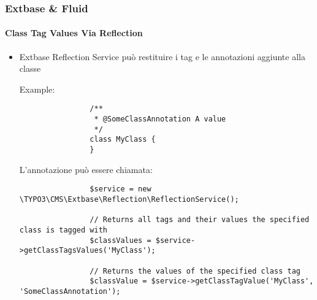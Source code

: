 \begin{frame}[fragile]
	\frametitle{Extbase \& Fluid}
	\framesubtitle{Class Tag Values Via Reflection}

	\lstset{
		basicstyle=\tiny\ttfamily
	}

	\begin{itemize}
		\item Extbase Reflection Service può restituire i tag e le annotazioni aggiunte alla classe\newline

			Example:
			\begin{lstlisting}
				/**
				 * @SomeClassAnnotation A value
				 */
				class MyClass {
				}
			\end{lstlisting}

			L'annotazione può essere chiamata:
			\begin{lstlisting}
				$service = new \TYPO3\CMS\Extbase\Reflection\ReflectionService();

				// Returns all tags and their values the specified class is tagged with
				$classValues = $service->getClassTagsValues('MyClass');

				// Returns the values of the specified class tag
				$classValue = $service->getClassTagValue('MyClass', 'SomeClassAnnotation');
			\end{lstlisting}

	\end{itemize}

\end{frame}

